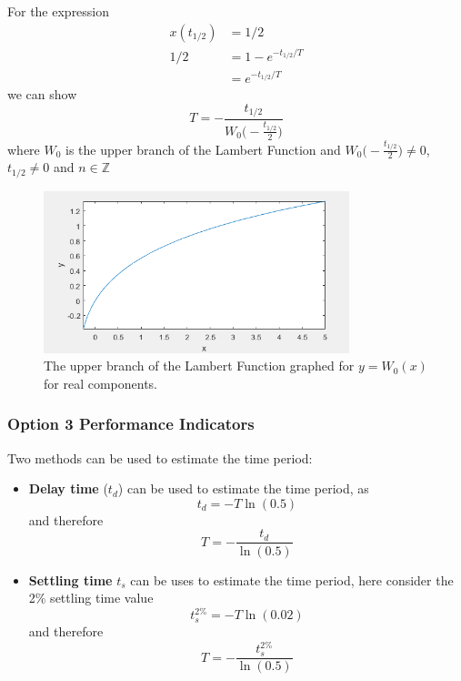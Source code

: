 \documentclass[12pt,letter]{article}
\begin{document}
\begin{itemize}
\begin{itemize}
\begin{mdframed}[middlelinewidth=0.5mm]
	\begin{center}
	\end{center}
For the expression
\begin{align}
x(t_{1/2}) &= 1/2 \\
1/2 &= 1-e^{-t_{1/2}/T} \nonumber \\
&= e^{-t_{1/2}/T} \nonumber
\end{align}
we can show 
\begin{equation}
T=-\frac{t_{1/2}}{W_0 \big(-\frac{t_{1/2}}{2}\big)}
\end{equation}
where $W_0$ is the upper branch of the Lambert Function and $W_0\big(-\frac{t_{1/2}}{2}\big) \neq 0$, $t_{1/2} \neq 0 $ and $n \in \mathbb{Z} $
\begin{figure}[H]
    \centering
    \includegraphics[width=3.5in]{../figures/Lambert_function}
	\caption{The upper branch of the Lambert Function graphed for $y = W_0(x)$ for real components. }
\end{figure}

\end{mdframed}




\end{itemize}
\end{itemize}

\subsubsection{Option 3 Performance Indicators}
 
Two methods can be used to estimate the time period:
\begin{itemize}
\item \textbf{Delay time} ($t_d$) can be used to estimate the time period, as 
\begin{equation}
t_d = -T \ln(0.5)
\end{equation}
and therefore
\begin{equation}
T = - \frac{t_d}{\ln(0.5)}
\end{equation}
\item \textbf{Settling time} $t_s$ can be uses to estimate the time period, here consider the 2\% settling time value 
\begin{equation}
t_s^{2\%} = -T \ln(0.02)
\end{equation}
and therefore
\begin{equation}
T = - \frac{t_s^{2\%}}{\ln(0.5)}
\end{equation}
\end{itemize}
\end{document}
